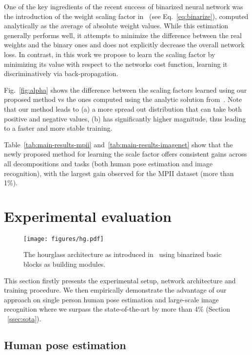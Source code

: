 \documentclass[10pt,twocolumn,letterpaper]{article}
\begin{document}
One of the key ingredients of the recent success of binarized neural network was the introduction of the  weight scaling factor in~\cite{rastegari2016xnor} (see Eq.~\ref{eq:binarize}), computed analytically as the average of absolute weight values. While this estimation generally performs well, it attempts to minimize the difference between the real weights and the binary ones  and does not explicitly decrease the overall network loss. In contrast, in this work we propose to learn the scaling factor by minimizing its value with respect to the networks cost function, learning it discriminatively via back-propagation.

Fig.~\ref{fig:alpha} shows the difference between the scaling factors learned using our proposed method vs the ones computed using the analytic solution from~\cite{rastegari2016xnor}. Note that our method leads to (a) a more spread out distribution that can take both positive and negative values, (b) has significantly higher magnitude, thus leading to a faster and more stable training.

Table~\ref{tab:main-results-mpii} and~\ref{tab:main-results-imagenet} show that the newly proposed method for learning the scale factor offers consistent gains across all decompositions and tasks (both human pose estimation and image recognition), with the largest gain observed for the MPII dataset (more than 1\%).
 \section{Experimental evaluation}\label{sec:experiments}

\begin{figure}
    \centering
    \texttt{[image: figures/hg.pdf]}
    \caption{The hourglass architecture as introduced in~\cite{newell2016stacked} using binarized basic blocks as building modules.}
    \label{fig:hg-arch}
\end{figure}

This section firstly presents the experimental setup, network architecture and training procedure. We then empirically demonstrate the advantage of our approach on single person human pose estimation and large-scale image recognition where we surpass the state-of-the-art by more than 4\% (Section ~\ref{ssec:sota}).

\subsection{Human pose estimation}
\end{document}
